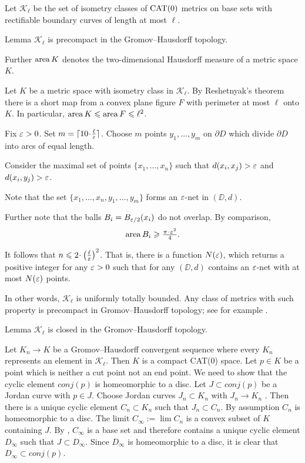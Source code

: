 \documentclass[a4paper,10pt]{amsart}
\begin{document}
Let $\mathcal{K}_\ell$ be the set of isometry classes of $\mathop{\rm CAT}\nolimits(0)$ metrics on base sets with rectifiable
boundary curves of length at most $\ell$.



\begin{thm}{Lemma}
$\mathcal{K}_\ell$ is precompact in the Gromov--Hausdorff topology.
\end{thm}

Further $\mathop{\rm area}\nolimits K$ denotes the two-dimensional Hausdorff measure of a metric space $K$. 

Let $K$ be a metric space with isometry class in $\mathcal {K}_\ell$.
By Reshetnyak's theorem there is a short map from a convex plane figure $F$ with perimeter at most $\ell$ onto $K$.
In particular, $\mathop{\rm area}\nolimits K \leqslant \mathop{\rm area}\nolimits F 
\leqslant \ell^2$.

Fix $\varepsilon>0$. 
Set $m=\lceil 10\cdot\tfrac\ell\eps\rceil$.
Choose $m$ points $y_1,\dots,y_m$ on $\partial D$
which divide $\partial D$ into arcs of equal length.

Consider the maximal set of points $\{x_1,\dots,x_n\}$ such that $d(x_i,x_j)>\varepsilon$ and $d(x_i,y_j)>\varepsilon$.

Note that the set $\{x_1,\dots,x_n,y_1,\dots,y_m\}$
forms an $\varepsilon$-net in $(\DD,d)$.

Further note that the balls $B_i=B_{\varepsilon/2}(x_i)$
do not overlap.
By comparison,
\[\area B_i\ge \tfrac{\pi\cdot\eps^2}{4}.\]

It follows that $n\le 2\cdot\left(\tfrac\ell\eps\right)^2$.
That is, there is a function $N(\varepsilon)$,
which returns a positive integer for any $\varepsilon>0$
such that for any 
$(\DD,d)$ contains an $\varepsilon$-net
with at most $N(\varepsilon)$ points.

In other words, $\mathcal{K}_\ell$ is uniformly totally bounded.
Any class of metrics with such property is precompact in Gromov--Hausdorff topology; 
see for example \cite[7.4.15]{BBI}.
\qeds





\begin{thm}{Lemma}
$\mathcal{K}_\ell$ is closed in the Gromov--Hausdorff topology.
\end{thm}
Let $K_n\to K$ be a Gromov--Hausdorff convergent sequence  where every $K_n$ represents an element in  $\mathcal{K}_\ell$. Then
$K$ is a compact CAT(0) space. Let $p\in K$ be a point which is neither a cut point not an end point. We need to show that the cyclic 
element $conj(p)$ is homeomorphic to a disc. Let $J\subset conj(p)$ be a Jordan curve with $p\in J$. Choose Jordan curves $J_n\subset K_n$
with $J_n\to K_n$ \cite[2.2]{W1}. Then there is a unique cyclic element $C_n\subset K_n$ such that $J_n\subset C_n$. By assumption $C_n$ is homeomorphic
to a disc. The limit $C_\infty:=\lim C_n$ is a convex subset of $K$ containing $J$. By \cite[6.3]{W1}, $C_\infty$ is a base set and therefore contains a
unique cyclic element $D_\infty$ such that $J\subset D_\infty$. Since $D_\infty$ is homeomorphic to a disc, it is clear that $D_\infty\subset conj(p)$.
\end{document}
